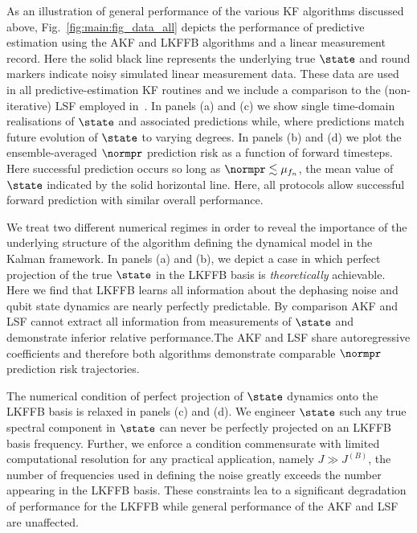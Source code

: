 {%

As an illustration of general performance of the various KF algorithms discussed above, Fig.~\ref{fig:main:fig_data_all} depicts the performance of predictive estimation using the AKF and LKFFB algorithms and a linear measurement record.  Here the solid black line represents the underlying true $\state$ and round markers indicate noisy simulated linear measurement data.  These data are used in all predictive-estimation KF routines and we include a comparison to the (non-iterative) LSF employed in~\cite{mavadia2017}.  In panels (a) and (c) we show single time-domain realisations of $\state$  and associated predictions while, where predictions match future evolution of $\state$ to varying degrees.  In panels (b) and (d) we plot the ensemble-averaged $\normpr$ prediction risk as a function of forward timesteps.  Here successful prediction occurs so long as $\normpr\lesssim \mu_{f_{n}}$, the mean value of $\state$ indicated by the solid horizontal line. Here, all protocols allow successful forward prediction with similar overall performance.

We treat two different numerical regimes in order to reveal the importance of the underlying structure of the algorithm defining the dynamical model in the Kalman framework.  In panels (a) and (b), we depict a case in which perfect projection of the true $\state$ in the LKFFB basis is \textit{theoretically} achievable.  Here we find that LKFFB learns all information about the dephasing noise and qubit state dynamics are nearly perfectly predictable.  By comparison AKF and LSF cannot extract all information from measurements of $\state$ and demonstrate inferior relative performance.The AKF and LSF share autoregressive coefficients and therefore both algorithms demonstrate comparable $\normpr$ prediction risk trajectories. 

The numerical condition of perfect projection of $\state$ dynamics onto the LKFFB basis is relaxed in panels (c) and (d).  We engineer $\state$ such any true spectral component in $\state$ can never be perfectly projected on an LKFFB basis frequency. Further, we enforce a condition commensurate with limited computational resolution for any practical application, namely $J \gg J^{(B)}$, the number of frequencies used in defining the noise greatly exceeds the number appearing in the LKFFB basis.  These constraints lea to a significant degradation of performance for the LKFFB while general performance of the AKF and LSF are unaffected. 

}
